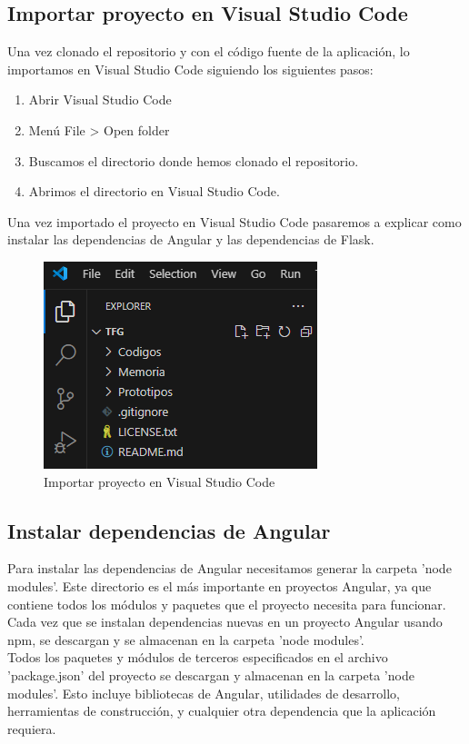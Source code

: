 \subsection{Importar proyecto en Visual Studio Code}
Una vez clonado el repositorio y con el código fuente de la aplicación, lo importamos en Visual Studio Code siguiendo los siguientes pasos:
\begin{enumerate}
    \item Abrir Visual Studio Code
    \item Menú File > Open folder
    \item Buscamos el directorio donde hemos clonado el repositorio.
    \item Abrimos el directorio en Visual Studio Code.
\end{enumerate}
Una vez importado el proyecto en Visual Studio Code pasaremos a explicar como instalar las dependencias de Angular y las dependencias de Flask.
\begin{figure}[H]
    \centering
    \includegraphics[width=0.55\linewidth]{img/importarVSC.png}
    \caption{Importar proyecto en Visual Studio Code}
    \label{fig:enter-label}
\end{figure}

\subsection{Instalar dependencias de Angular}
Para instalar las dependencias de Angular necesitamos generar la carpeta 'node modules'. Este directorio es el más importante en proyectos Angular, ya que contiene todos los módulos y paquetes que el proyecto necesita para funcionar. Cada vez que se instalan dependencias nuevas en un proyecto Angular usando npm, se descargan y se almacenan en la carpeta 'node modules'. \\
Todos los paquetes y módulos de terceros especificados en el archivo 'package.json' del proyecto se descargan y almacenan en la carpeta 'node modules'. Esto incluye bibliotecas de Angular, utilidades de desarrollo, herramientas de construcción, y cualquier otra dependencia que la aplicación requiera.

